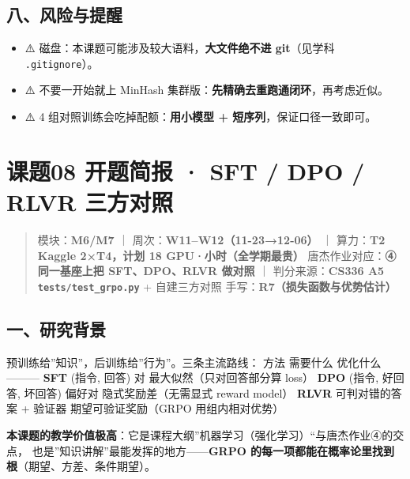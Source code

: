 \documentclass[
  chinese,
  11pt,
]{ctexart}
\providecommand{\tightlist}{%
  \setlength{\itemsep}{0pt}\setlength{\parskip}{0pt}}
\begin{document}
\subsection{八、风险与提醒}\label{ux516bux98ceux9669ux4e0eux63d0ux9192-5}

\begin{itemize}
\tightlist
\item
  ⚠️ 磁盘：本课题可能涉及较大语料，\textbf{大文件绝不进 git}（见学科 \texttt{.gitignore}）。
\item
  ⚠️ 不要一开始就上 MinHash 集群版：\textbf{先精确去重跑通闭环}，再考虑近似。
\item
  ⚠️ 4 组对照训练会吃掉配额：\textbf{用小模型 + 短序列}，保证口径一致即可。
\end{itemize}

\newpage

\section{课题08 开题简报 · SFT / DPO / RLVR 三方对照}\label{ux8bfeux989808-ux5f00ux9898ux7b80ux62a5-sft-dpo-rlvr-ux4e09ux65b9ux5bf9ux7167}

\begin{quote}
模块：\textbf{M6/M7} ｜ 周次：\textbf{W11--W12（11-23→12-06）} ｜ 算力：\textbf{T2 Kaggle 2×T4，计划 18 GPU·小时（全学期最贵）} 唐杰作业对应：\textbf{④ 同一基座上把 SFT、DPO、RLVR 做对照} ｜ 判分来源：\textbf{CS336 A5 \texttt{tests/test\_grpo.py}} + 自建三方对照 手写：\textbf{R7（损失函数与优势估计）}
\end{quote}

\subsection{一、研究背景}\label{ux4e00ux7814ux7a76ux80ccux666f-6}

预训练给''知识''，后训练给''行为''。三条主流路线： \textbar{} 方法 \textbar{} 需要什么 \textbar{} 优化什么 \textbar{} \textbar---\textbar---\textbar---\textbar{} \textbar{} \textbf{SFT} \textbar{} (指令, 回答) 对 \textbar{} 最大似然（只对回答部分算 loss） \textbar{} \textbar{} \textbf{DPO} \textbar{} (指令, 好回答, 坏回答) 偏好对 \textbar{} 隐式奖励差（无需显式 reward model） \textbar{} \textbar{} \textbf{RLVR} \textbar{} 可判对错的答案 + 验证器 \textbar{} 期望可验证奖励（GRPO 用组内相对优势） \textbar{}

\textbf{本课题的教学价值极高}：它是课程大纲''机器学习（强化学习）``与唐杰作业④的交点， 也是''知识讲解''最能发挥的地方------\textbf{GRPO 的每一项都能在概率论里找到根}（期望、方差、条件期望）。
\end{document}
